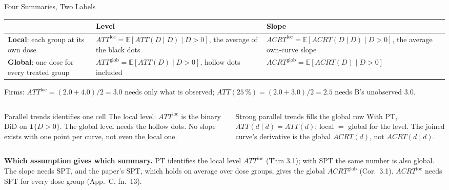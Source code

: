 \documentclass[main.tex]{subfiles}
\begin{document}
\begin{frame}{Four Summaries, Two Labels}
  \begin{center}\footnotesize
  \begin{tabular}{@{}p{3.6cm}p{4.6cm}p{4.6cm}@{}}
    \toprule
    & Level & Slope \\
    \midrule
    \textbf{Local}: each group at its own dose
      & $ATT^{\text{loc}} = \mathbb{E}[ATT(D\mid D)\mid D>0]$, the average of the black dots
      & $ACRT^{\text{loc}} = \mathbb{E}[ACRT(D\mid D)\mid D>0]$, the average own-curve slope \\[3pt]
    \textbf{Global}: one dose for every treated group
      & $ATT^{\text{glob}} = \mathbb{E}[ATT(D)\mid D>0]$, hollow dots included
      & $ACRT^{\text{glob}} = \mathbb{E}[ACRT(D)\mid D>0]$ \\
    \bottomrule
  \end{tabular}
  \end{center}
  \smallskip
  \footnotesize
  Firms: $ATT^{\text{loc}} = (2.0 + 4.0)/2 = 3.0$ needs only what is observed;
  $ATT(25\,\%) = (2.0 + 3.0)/2 = 2.5$ needs B's unobserved $3.0$.
  \medskip
  \begin{columns}[T]
    \begin{column}{0.48\textwidth}
      \begin{block}{\footnotesize Parallel trends identifies one cell}
        \footnotesize
        The local level: $ATT^{\text{loc}}$ is the binary DiD on
        $\mathbf{1}\{D>0\}$. The global level needs the hollow dots. No slope
        exists with one point per curve, not even the local one.
      \end{block}
    \end{column}
    \begin{column}{0.48\textwidth}
      \begin{block}{\footnotesize Strong parallel trends fills the global row}
        \footnotesize
        With PT, $ATT(d\mid d) = ATT(d)$: local $=$ global for the level. The
        joined curve's derivative is the global $ACRT(d)$, not $ACRT(d\mid d)$.
      \end{block}
    \end{column}
  \end{columns}
  \medskip
  \footnotesize \textbf{Which assumption gives which summary.} PT identifies
  the local level $ATT^{\text{loc}}$ (Thm 3.1); with SPT the same number is also
  global. The slope needs SPT, and the paper's SPT, which holds on average over
  dose groups, gives the global $ACRT^{\text{glob}}$ (Cor.~3.1).
  $ACRT^{\text{loc}}$ needs SPT for every dose group (App.~C, fn.~13).
\end{frame}
\end{document}
